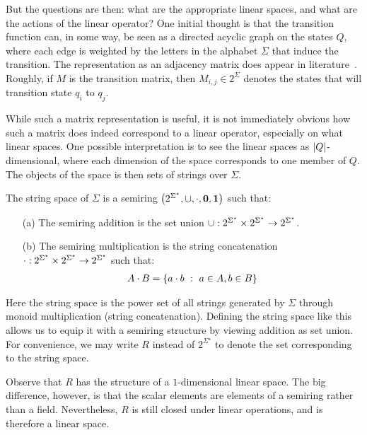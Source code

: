 But the questions are then:
what are the appropriate linear spaces,
and what are the actions of the linear operator?
One initial thought is that the transition function can, in some way,
be seen as a directed acyclic graph on the states \(Q\),
where each edge is weighted by the letters in the alphabet \(\Sigma\)
that induce the transition.
The representation as an adjacency matrix does appear in
literature~\cite{savage1998models}.
Roughly, if \(M\) is the transition matrix, then \(M_{i, j} \in 2^{\Sigma}\)
denotes the states that will transition state \(q_i\) to \(q_j\).

While such a matrix representation is useful,
it is not immediately obvious how such a matrix does indeed correspond
to a linear operator, especially on what linear spaces.
One possible interpretation is to see
the linear spaces as \(\left\lvert Q\right\rvert\)-dimensional,
where each dimension of the space corresponds to one member of \(Q\).
The objects of the space is then sets of strings over \(\Sigma\).

\begin{definition}
  The string space of \(\Sigma\) is a semiring
  \(\left(2^{\Sigma^\star}, \cup, \cdot, \mathbf{0}, \mathbf{1}\right)\)
  such that:
  \begin{enumerate}
    \item[(a)]
      The semiring addition is the set union
      \(\cup : 2^{\Sigma^\star} \times
        2^{\Sigma^\star} \to 2^{\Sigma^\star}\).

    \item[(b)]
      The semiring multiplication is the string concatenation
      \(\cdot : 2^{\Sigma^\star} \times
        2^{\Sigma^\star} \to 2^{\Sigma^\star}\)
      such that:
      \begin{align*}
        A \cdot B
          = \left\{a \cdot b \  : \  a \in A, b \in B\right\}
      \end{align*}
  \end{enumerate}
\end{definition}

Here the string space is the power set of all strings generated
by \(\Sigma\) through monoid multiplication (string concatenation).
Defining the string space like this allows us to equip it with a semiring
structure by viewing addition as set union.
For convenience,
we may write \(R\) instead of \(2^{\Sigma^\star}\)
to denote the set corresponding to the string space.

Observe that \(R\) has the structure of a \(1\)-dimensional linear space.
The big difference, however, is that the scalar elements are
elements of a semiring rather than a field.
Nevertheless, \(R\) is still closed under linear operations,
and is therefore a linear space.

